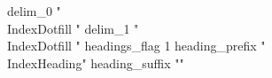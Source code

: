 delim_0 "\\IndexDotfill "
delim_1 "\\IndexDotfill "
headings_flag 1
heading_prefix "  \\IndexHeading{"
heading_suffix "}\n"
